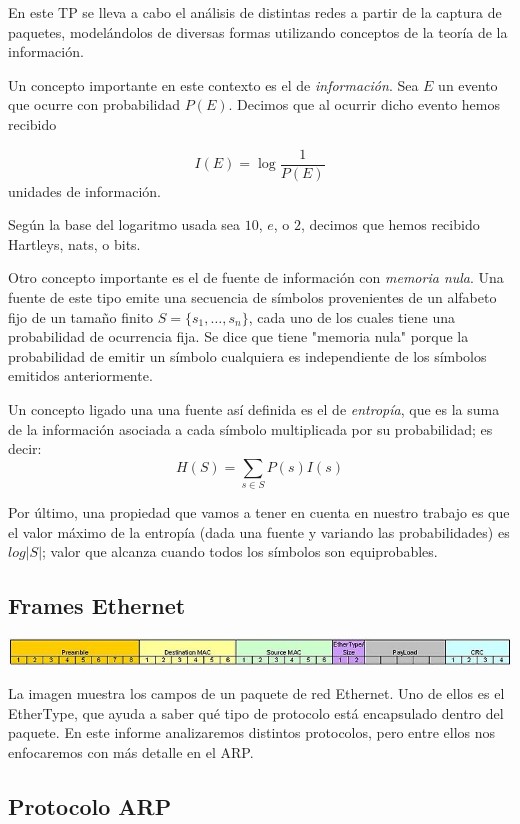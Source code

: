 En este TP se lleva a cabo el análisis de distintas redes a partir de
la captura de paquetes, modelándolos de diversas formas utilizando
conceptos de la teoría de la información.
 
Un concepto importante en este contexto es el de \textit{información}. Sea $E$
un evento que ocurre con probabilidad $P(E)$. Decimos que al ocurrir
dicho evento hemos recibido

$$
I(E) = \log{\frac{1}{P(E)}}
$$
unidades de información.
 
Según la base del logaritmo usada sea $10$, $e$, o $2$, decimos que
hemos recibido Hartleys, nats, o bits.
 
Otro concepto importante es el de fuente de información con 
\textit{memoria nula}.
Una fuente de este tipo emite una secuencia de símbolos
provenientes de un alfabeto fijo de un tamaño finito $S
= \{s_1, \dots, s_n\}$, cada uno de los cuales tiene una probabilidad
de ocurrencia fija. Se dice que tiene "memoria nula" porque la
probabilidad de emitir un símbolo cualquiera es independiente de los
símbolos emitidos anteriormente.

Un concepto ligado una una fuente así definida es el de \textit{entropía}, que
es la suma de la información asociada a cada símbolo multiplicada por
su probabilidad; es decir:
$$
H(S) = \sum_{s \in S} P(s)I(s)
$$

Por último, una propiedad que vamos a tener en cuenta en nuestro
trabajo es que el valor máximo de la entropía (dada una fuente y
variando las probabilidades) es $log |S|$; valor que
alcanza cuando todos los símbolos son equiprobables.

\subsection{Frames Ethernet}

\begin{center}
\includegraphics[scale=0.6]{Ether.jpg}
\end{center}

La imagen muestra los campos de un paquete de red Ethernet.
Uno de ellos es el EtherType,
que ayuda a saber qué tipo de protocolo está encapsulado dentro del paquete.
En este informe analizaremos distintos protocolos, pero entre ellos
nos enfocaremos con más detalle en el ARP.

\subsection{Protocolo ARP}


